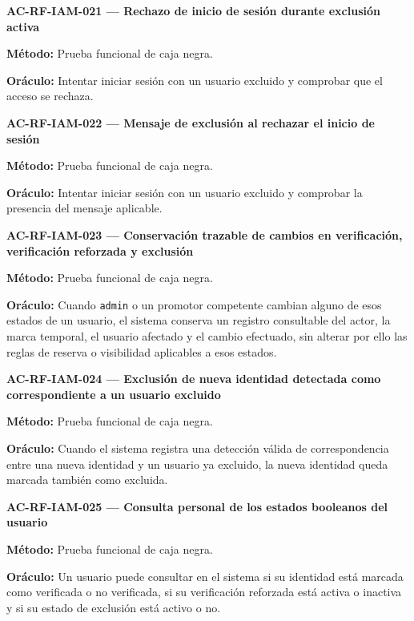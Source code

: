\documentclass[10pt,letterpaper]{article}
\begin{document}
\noindent\textbf{AC-RF-IAM-021 --- Rechazo de inicio de sesión durante exclusión activa}\par
\textbf{Método:} Prueba funcional de caja negra.\par
\textbf{Oráculo:} Intentar iniciar sesión con un usuario excluido y comprobar que el acceso se rechaza.\par\vspace{0.45em}
\noindent\textbf{AC-RF-IAM-022 --- Mensaje de exclusión al rechazar el inicio de sesión}\par
\textbf{Método:} Prueba funcional de caja negra.\par
\textbf{Oráculo:} Intentar iniciar sesión con un usuario excluido y comprobar la presencia del mensaje aplicable.\par\vspace{0.45em}
\noindent\textbf{AC-RF-IAM-023 --- Conservación trazable de cambios en verificación, verificación reforzada y exclusión}\par
\textbf{Método:} Prueba funcional de caja negra.\par
\textbf{Oráculo:} Cuando \texttt{admin} o un promotor competente cambian alguno de esos estados de un usuario, el sistema conserva un registro consultable del actor, la marca temporal, el usuario afectado y el cambio efectuado, sin alterar por ello las reglas de reserva o visibilidad aplicables a esos estados.\par\vspace{0.45em}
\noindent\textbf{AC-RF-IAM-024 --- Exclusión de nueva identidad detectada como correspondiente a un usuario excluido}\par
\textbf{Método:} Prueba funcional de caja negra.\par
\textbf{Oráculo:} Cuando el sistema registra una detección válida de correspondencia entre una nueva identidad y un usuario ya excluido, la nueva identidad queda marcada también como excluida.\par\vspace{0.45em}
\noindent\textbf{AC-RF-IAM-025 --- Consulta personal de los estados booleanos del usuario}\par
\textbf{Método:} Prueba funcional de caja negra.\par
\textbf{Oráculo:} Un usuario puede consultar en el sistema si su identidad está marcada como verificada o no verificada, si su verificación reforzada está activa o inactiva y si su estado de exclusión está activo o no.\par\vspace{0.45em}
\end{document}
